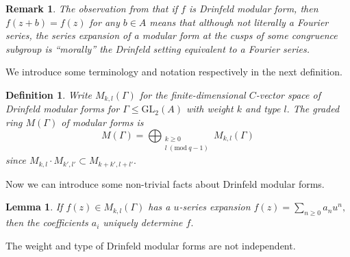 \documentclass[11pt]{amsart}
\newtheorem{lemma}[theorem]{Lemma}
\newtheorem{definition}[theorem]{Definition}
\newtheorem{remark}[theorem]{Remark}
\theoremstyle{definition}
\numberwithin{equation}{section}
\newcommand{\GL}{\mathrm{GL}} 	%
\newcommand{\Mod}[1]{\ (\mathrm{mod}\ #1)}
\begin{document}
		\begin{remark}
			The observation from \cite[Definition $(5.7)$]{Gekeler-Coeff} that if $f$ is Drinfeld modular form, then $f(z+b)=f(z)$ for any $b\in A$ means that although not literally a Fourier series, the series expansion of a modular form at the cusps of some congruence subgroup is ``morally'' the Drinfeld setting equivalent to a Fourier series.   
		\end{remark}
		
		We introduce some terminology and notation respectively in the next definition.
		
		\begin{definition}
			Write $M_{k,l}(\Gamma)$ for the finite-dimensional $C$-vector space of Drinfeld modular forms for $\Gamma\leq \GL_2(A)$ with weight $k$ and type $l.$ The graded ring $M(\Gamma)$ of modular forms is 
			\[M(\Gamma)=\bigoplus_{\substack{k\geq 0\\l\Mod{q-1}}} M_{k,l}(\Gamma)\]
			since $M_{k,l}\cdot M_{k',l'}\subset M_{k+k',l+l'}.$
		\end{definition}
		
		Now we can introduce some non-trivial facts about Drinfeld modular forms.
		
		\begin{lemma}\cite[Remark $5.8.\mathrm{iii}$]{Gekeler-Coeff}\label{l: u-series coeffs determine form}
			If $f(z)\in M_{k,l}(\Gamma)$ has a $u$-series expansion $f(z)=\sum_{n\geq 0}a_nu^n,$ then the coefficients $a_i$ uniquely determine $f.$
		\end{lemma}
		
		The weight and type of Drinfeld modular forms are not independent. 
		
\end{document}
